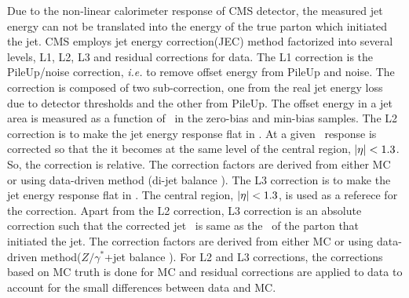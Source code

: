 Due to the non-linear calorimeter response of CMS detector, 
the measured jet energy can not be translated into the energy of the true parton which 
initiated the jet. CMS employs jet energy correction(JEC) method \cite{} factorized into 
several levels, L1, L2, L3 and residual corrections for data. 
The L1 correction is the PileUp/noise correction, \textit{i.e.} to remove offset energy 
from PileUp and noise. The correction is composed of two sub-correction, 
one from the real jet energy loss due to detector thresholds and 
the other from PileUp. The offset energy in a jet area is measured as a function 
of \Eta\ in the zero-bias and min-bias samples.    
The L2 correction is to make the jet energy response flat in \Eta.  
At a given \Eta\ response is corrected so that the it becomes at the same level 
of the central region, $|\eta|<1.3$. So, the correction is relative. 
The correction factors are derived from either MC or using data-driven method
(di-jet balance \cite{}).
The L3 correction is to make the jet energy response flat in \pt.  
The central region, $|\eta|<1.3$, is used as a referece for the correction. 
Apart from the L2 correction, L3 correction is an absolute correction 
such that the corrected jet \pt\ is same as the \pt\ of the parton that 
initiated the jet. The correction factors are derived from either MC 
or using data-driven method($Z/\gamma^*$+jet balance \cite{}). 
For L2 and L3 corrections, the corrections based on MC truth is done for MC 
and residual corrections are applied to data to account for the small differences 
between data and MC. 

